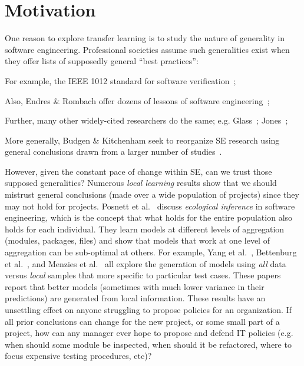 \section{Motivation}
\label{sec:Motivation}

One reason to explore transfer learning
is to study the nature of
generality in software engineering.  Professional
societies assume such generalities exist when they
offer lists of supposedly general ``best practices'':
\squishlist
\item For example, the  IEEE 1012 standard for software
  verification~\cite{1012};
\item
  Also, Endres \& Rombach offer
dozens of lessons of software
engineering~\cite{endres03};
\item Further, many other
widely-cited researchers do the same; e.g.
Glass~\cite{glass02}; Jones~\cite{jones10};
\item
  More generally, Budgen \& Kitchenham seek to
reorganize SE research using general conclusions
drawn from a larger number of
studies~\cite{budgen06,budgen09}.
\squishend


However,
given the constant pace of change within SE, can we trust
those supposed generalities? 
Numerous {\em local learning} results show that we
should mistrust general conclusions (made over a
wide population of projects) since they may not hold
for projects.  Posnett et al.~\cite{posnett11}
discuss {\em ecological inference} in software
engineering, which is the concept that what holds
for the entire population also holds for each
individual.  They learn models at different levels
of aggregation (modules, packages, files) and show
that models that work at one level of aggregation
can be sub-optimal at others.  For example, Yang et
al.~\cite{yang11}, Bettenburg et
al.~\cite{betten14}, and Menzies et al.~\cite{me12d}
all explore the generation of models using {\em all}
data versus {\em local} samples that more specific
to particular test cases. These papers report that
better models (sometimes with much lower variance in
their predictions) are generated from local
information.
These results have an unsettling effect on anyone
struggling to propose policies for an organization.
If all prior conclusions can change for the new
project, or some small part of a project, how can
any manager ever hope to propose and defend IT
policies (e.g. when should some module be inspected,
when should it be refactored, where to focus
expensive testing procedures, etc)?

